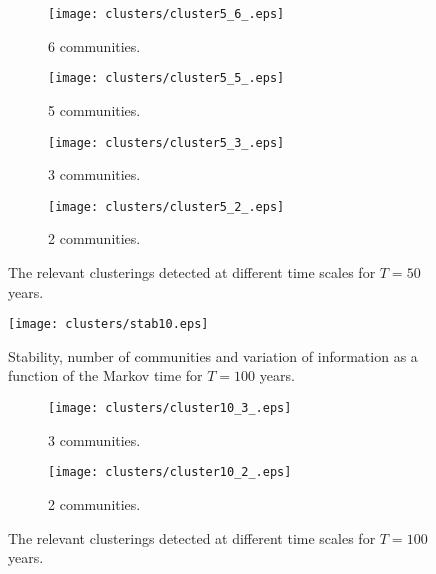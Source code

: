 \begin{figure}[H]
	\centering
	\begin{subfigure}[t]{0.49\textwidth}
		\texttt{[image: clusters/cluster5\_6\_.eps]}
		\caption{6 communities.}
		\label{fig:cluster5_6_}
	\end{subfigure}
	\begin{subfigure}[t]{0.49\textwidth}
		\texttt{[image: clusters/cluster5\_5\_.eps]}
		\caption{5 communities.}
		\label{fig:cluster5_5_}
	\end{subfigure}
	\begin{subfigure}[t]{0.49\textwidth}
		\texttt{[image: clusters/cluster5\_3\_.eps]}
		\caption{3 communities.}
		\label{fig:cluster5_3_}
	\end{subfigure}
	\begin{subfigure}[t]{0.49\textwidth}
		\texttt{[image: clusters/cluster5\_2\_.eps]}
		\caption{2 communities.}
		\label{fig:cluster5_2_}
	\end{subfigure}
	\caption{The relevant clusterings detected at different time scales for $T=50$ years.}
	\label{fig:cluster5}
\end{figure}

\begin{figure}[H]
	\centering
	\texttt{[image: clusters/stab10.eps]}
	\caption{Stability, number of communities and variation of information as a function of the Markov time for $T=100$ years.}
	\label{fig:stab10}
\end{figure}

\begin{figure}[H]
	\centering
	\begin{subfigure}[t]{0.49\textwidth}
		\texttt{[image: clusters/cluster10\_3\_.eps]}
		\caption{3 communities.}
		\label{fig:cluster10_3_}
	\end{subfigure}
	\begin{subfigure}[t]{0.49\textwidth}
		\texttt{[image: clusters/cluster10\_2\_.eps]}
		\caption{2 communities.}
		\label{fig:cluster10_2_}
	\end{subfigure}
	\caption{The relevant clusterings detected at different time scales for $T=100$ years.}
	\label{fig:cluster10}
\end{figure}